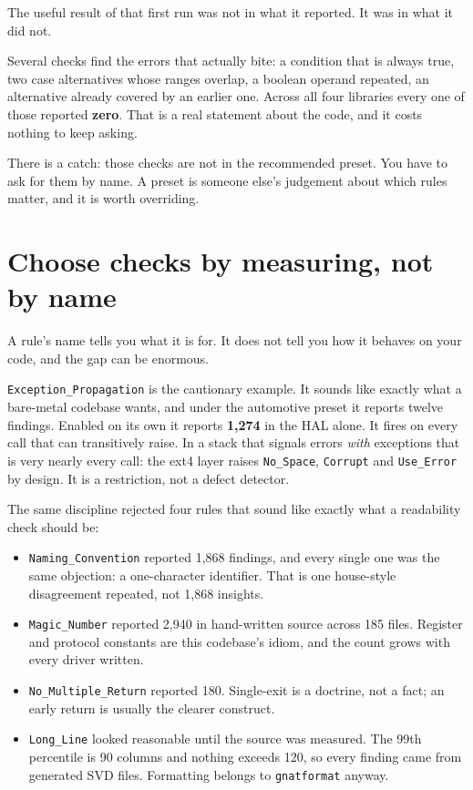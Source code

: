 The useful result of that first run was not in what it reported. It was in what it did
not.

Several checks find the errors that actually bite: a condition that is always true, two
case alternatives whose ranges overlap, a boolean operand repeated, an alternative
already covered by an earlier one. Across all four libraries every one of those
reported \textbf{zero}. That is a real statement about the code, and it costs nothing
to keep asking.

There is a catch: those checks are not in the recommended preset. You have to ask for
them by name. A preset is someone else's judgement about which rules matter, and it is
worth overriding.

\section{Choose checks by measuring, not by name}

A rule's name tells you what it is for. It does not tell you how it behaves on your
code, and the gap can be enormous.

\lstinline{Exception_Propagation} is the cautionary example. It sounds like exactly
what a bare-metal codebase wants, and under the automotive preset it reports twelve
findings. Enabled on its own it reports \textbf{1,274} in the HAL alone. It fires on
every call that can transitively raise. In a stack that signals errors \emph{with}
exceptions that is very nearly every call: the ext4 layer raises
\lstinline{No_Space}, \lstinline{Corrupt} and \lstinline{Use_Error} by design. It is a restriction,
not a defect detector.

The same discipline rejected four rules that sound like exactly what a readability
check should be:

\begin{itemize}
\item \lstinline{Naming_Convention} reported 1,868 findings, and every single one was
  the same objection: a one-character identifier. That is one house-style disagreement
  repeated, not 1,868 insights.
\item \lstinline{Magic_Number} reported 2,940 in hand-written source across 185 files.
  Register and protocol constants are this codebase's idiom, and the count grows with
  every driver written.
\item \lstinline{No_Multiple_Return} reported 180. Single-exit is a doctrine, not a
  fact; an early return is usually the clearer construct.
\item \lstinline{Long_Line} looked reasonable until the source was measured. The 99th
  percentile is 90 columns and nothing exceeds 120, so every finding came from
  generated SVD files. Formatting belongs to \texttt{gnatformat} anyway.
\end{itemize}

